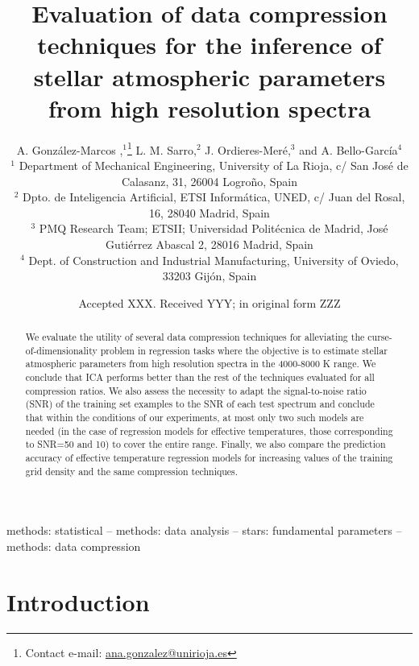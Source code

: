 \documentclass[a4paper,fleqn,usenatbib]{mnras}
\title[]{Evaluation of data compression techniques for the inference of
  stellar atmospheric parameters from high resolution spectra}
\author[A. Gonz\'alez-Marcos et al.]{
A. Gonz\'alez-Marcos ,$^{1}$\thanks{Contact e-mail: \href{mailto:}{ana.gonzalez@unirioja.es}}
L. M. Sarro,$^{2}$
J. Ordieres-Mer\'e,$^{3}$
and A. Bello-Garc\'ia$^{4}$
\\
$^{1}$ Department of Mechanical Engineering, University of La Rioja, c/ San Jos\'e de Calasanz, 31, 26004 Logro\~no, Spain  \\
$^{2}$ Dpto. de Inteligencia Artificial, ETSI Inform\'atica, UNED, c/ Juan del Rosal, 16, 28040 Madrid, Spain \\
$^{3}$ PMQ Research Team; ETSII; Universidad Polit\'ecnica de Madrid, Jos\'e Guti\'errez Abascal 2, 28016 Madrid, Spain\\
$^{4}$ Dept. of Construction and Industrial Manufacturing, University of Oviedo, 33203 Gij\'on, Spain\\
}
\date{Accepted XXX. Received YYY; in original form ZZZ}
\begin{document}
\label{firstpage}
\pagerange{\pageref{firstpage}--\pageref{lastpage}}
\maketitle

\begin{abstract}
We evaluate the utility of several data compression techniques
  for alleviating the curse-of-dimensionality problem in regression
  tasks where the objective is to estimate stellar atmospheric
  parameters from high resolution spectra in the 4000-8000 K range. We
  conclude that ICA performs better than the rest of the
  techniques evaluated for all compression ratios. We also assess the
  necessity to adapt the signal-to-noise ratio (SNR) of the training
  set examples to the SNR of each test spectrum and conclude that
  within the conditions of our experiments, at most only two such models are
  needed (in the case of regression models for effective temperatures, 
  those corresponding to SNR=50 and 10) to cover the entire range. Finally, we also 
  compare the prediction accuracy of effective 
  temperature regression models for increasing values of the training grid 
  density and the same compression techniques. 
\end{abstract}

\begin{keywords}
methods: statistical -- methods: data analysis -- stars: fundamental parameters -- methods: data compression
\end{keywords}



\section{Introduction}
\end{document}
